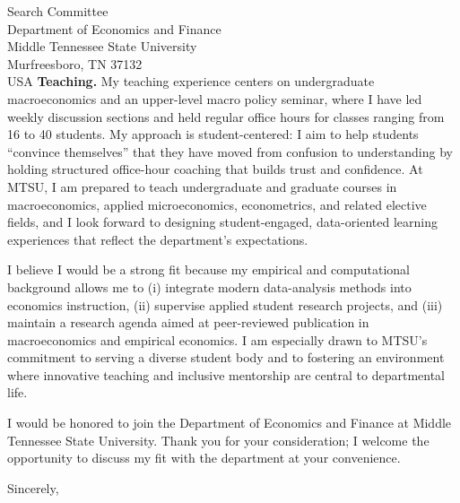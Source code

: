 \documentclass[11pt,letterpaper]{letter}
\begin{document}
\begin{letter}{Search Committee \\
Department of Economics and Finance \\
Middle Tennessee State University \\
Murfreesboro, TN 37132 \\ USA}
\textbf{Teaching.} My teaching experience centers on undergraduate macroeconomics and an upper-level macro policy seminar, where I have led weekly discussion sections and held regular office hours for classes ranging from 16 to 40 students. My approach is student-centered: I aim to help students “convince themselves” that they have moved from confusion to understanding by holding structured office-hour coaching that builds trust and confidence. At MTSU, I am prepared to teach undergraduate and graduate courses in macroeconomics, applied microeconomics, econometrics, and related elective fields, and I look forward to designing student-engaged, data-oriented learning experiences that reflect the department’s expectations.

I believe I would be a strong fit because my empirical and computational background allows me to (i) integrate modern data-analysis methods into economics instruction, (ii) supervise applied student research projects, and (iii) maintain a research agenda aimed at peer-reviewed publication in macroeconomics and empirical economics. I am especially drawn to MTSU’s commitment to serving a diverse student body and to fostering an environment where innovative teaching and inclusive mentorship are central to departmental life.

I would be honored to join the Department of Economics and Finance at Middle Tennessee State University. Thank you for your consideration; I welcome the opportunity to discuss my fit with the department at your convenience.

\closing{Sincerely,}

\end{letter}
\end{document}
